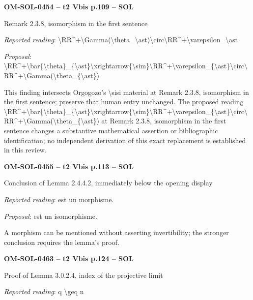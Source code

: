 \par\noindent\textbf{OM-SOL-0454 -- t2 Vbis p.109 -- SOL}\par
Remark 2.3.8, isomorphism in the first sentence\par
\emph{Reported reading}: \textbackslash{}RR\textasciicircum{}+\textbackslash{}Gamma(\textbackslash{}theta\_\textbackslash{}ast)\textbackslash{}circ\textbackslash{}RR\textasciicircum{}+\textbackslash{}varepsilon\_\textbackslash{}ast\par
\emph{Proposal}: \textbackslash{}RR\textasciicircum{}+\textbackslash{}bar\{\textbackslash{}theta\}\_\{\textbackslash{}ast\}\textbackslash{}xrightarrow\{\textbackslash{}sim\}\textbackslash{}RR\textasciicircum{}+\textbackslash{}varepsilon\_\{\textbackslash{}ast\}\textbackslash{}circ\textbackslash{}RR\textasciicircum{}+\textbackslash{}Gamma(\textbackslash{}theta\_\{\textbackslash{}ast\})\par
This finding intersects Orgogozo's \textbackslash{}sisi material at Remark 2.3.8, isomorphism in the first sentence; preserve that human entry unchanged. The proposed reading \textbackslash{}RR\textasciicircum{}+\textbackslash{}bar\{\textbackslash{}theta\}\_\{\textbackslash{}ast\}\textbackslash{}xrightarrow\{\textbackslash{}sim\}\textbackslash{}RR\textasciicircum{}+\textbackslash{}varepsilon\_\{\textbackslash{}ast\}\textbackslash{}circ\textbackslash{}RR\textasciicircum{}+\textbackslash{}Gamma(\textbackslash{}theta\_\{\textbackslash{}ast\}) at Remark 2.3.8, isomorphism in the first sentence changes a substantive mathematical assertion or bibliographic identification; no independent derivation of this exact replacement is established in this review.\par
\par\noindent\textbf{OM-SOL-0455 -- t2 Vbis p.113 -- SOL}\par
Conclusion of Lemma 2.4.4.2, immediately below the opening display\par
\emph{Reported reading}: est un morphisme.\par
\emph{Proposal}: est un isomorphisme.\par
A morphism can be mentioned without asserting invertibility; the stronger conclusion requires the lemma's proof.\par
\par\noindent\textbf{OM-SOL-0463 -- t2 Vbis p.124 -- SOL}\par
Proof of Lemma 3.0.2.4, index of the projective limit\par
\emph{Reported reading}: q \textbackslash{}geq n\par
